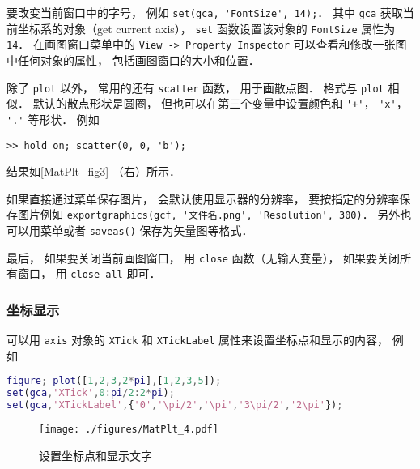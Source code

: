 要改变当前窗口中的字号， 例如 \verb|set(gca, 'FontSize', 14);|． 其中 \verb|gca| 获取当前坐标系的对象（get current axis）， \verb|set| 函数设置该对象的 \verb|FontSize| 属性为 \verb|14|． 在画图窗口菜单中的 \verb|View -> Property Inspector| 可以查看和修改一张图中任何对象的属性， 包括画图窗口的大小和位置．

除了 \verb|plot| 以外， 常用的还有 \verb|scatter| 函数， 用于画散点图． 格式与 \verb|plot| 相似． 默认的散点形状是圆圈， 但也可以在第三个变量中设置颜色和 \verb|'+'|， \verb|'x'|， \verb|'.'| 等形状． 例如
\begin{lstlisting}[language=matlabC]
>> hold on; scatter(0, 0, 'b');
\end{lstlisting}
结果如\autoref{MatPlt_fig3} （右）所示．

如果直接通过菜单保存图片， 会默认使用显示器的分辨率， 要按指定的分辨率保存图片例如 \verb|exportgraphics(gcf, '文件名.png', 'Resolution', 300)|． 另外也可以用菜单或者 \verb|saveas()| 保存为矢量图等格式．

最后， 如果要关闭当前画图窗口， 用 \verb|close| 函数（无输入变量）， 如果要关闭所有窗口， 用 \verb|close all| 即可．

\subsubsection{坐标显示}
可以用 \verb|axis| 对象的 \verb|XTick| 和 \verb|XTickLabel| 属性来设置坐标点和显示的内容， 例如 
\begin{lstlisting}[language=matlab]
figure; plot([1,2,3,2*pi],[1,2,3,5]);
set(gca,'XTick',0:pi/2:2*pi);
set(gca,'XTickLabel',{'0','\pi/2','\pi','3\pi/2','2\pi'});
\end{lstlisting}
\begin{figure}[ht]
\centering
\texttt{[image: ./figures/MatPlt\_4.pdf]}
\caption{设置坐标点和显示文字} \label{MatPlt_fig4}
\end{figure}

